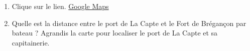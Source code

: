 

\begin{enumerate}
\item Clique sur le lien. \href{https://www.google.com/maps/place/Cart\%C3\%A9,+65270,+France/@43.0427519,6.2348953,12.29z/data=!4m5!3m4!1s0xd57cdc9541a448b:0x8f62403cc90fc436!8m2!3d43.11184!4d-0.182035}{Google Maps}
\item Quelle est la distance entre le port de La Capte et le Fort de Brégançon par bateau ? Agrandis la carte pour localiser le port de La Capte et sa capitainerie.

\end{enumerate}
